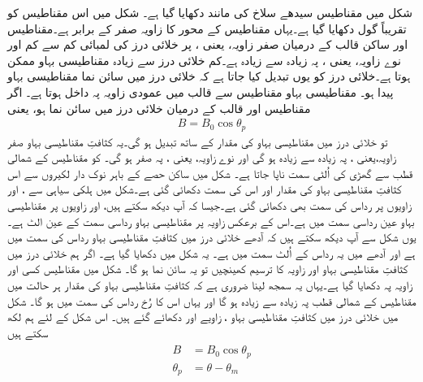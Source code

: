 شکل   میں مقناطیس سیدھے سلاخ کی مانند دکھایا گیا ہے۔ شکل   میں اس مقناطیس کو تقریباً گول دکھایا گیا ہے۔یہاں مقناطیس کے محور کا زاویہ  صفر کے برابر ہے۔مقناطیس اور ساکن قالب کے درمیان صفر زاویہ، یعنی   ، پر خلائی درز کی لمبائی کم سے کم اور نوے  زاویہ، یعنی  ، پہ زیادہ سے زیادہ ہے۔کم خلائی درز سے زیادہ مقناطیسی بہاو ممکن ہوتا ہے۔خلائی درز کو یوں تبدیل کیا جاتا ہے کہ  خلائی درز میں سائن نما مقناطیسی بہاو پیدا ہو۔ مقناطیسی بہاو مقناطیس سے قالب میں عمودی زاویہ پہ داخل ہوتا ہے۔  اگر مقناطیس اور قالب کے درمیان خلائی درز میں  سائن نما ہو، یعنی
\begin{align}
B=B_0 \cos \theta_p
\end{align}
تو خلائی درز میں مقناطیسی بہاو  کی مقدار  کے ساتھ تبدیل ہو گی۔یہ کثافتِ مقناطیسی بہاو صفر زاویہ،یعنی ، پہ زیادہ سے زیادہ ہو گی اور نوے زاویہ، یعنی  ، پہ صفر ہو گی۔ کو مقناطیس کے شمالی قطب  سے گھڑی کی اُلٹی سمت ناپا جاتا ہے۔  شکل   میں  ساکن حصے کے باہر نوک دار لکیروں سے اس کثافتِ مقناطیسی بہاو کی مقدار اور اس کی سمت دکھائی گئی ہے۔شکل میں ہلکی سیاہی سے ،  اور  زاویوں پر رداس کی سمت بھی دکھائی گئی ہے۔جیسا کہ آپ دیکھ سکتے ہیں، اور   زاویوں پر مقناطیسی بہاو عین رداسی سمت میں ہے۔اس کے برعکس زاویہ  پر مقناطیسی بہاو رداسی سمت کے عین الٹ ہے۔یوں شکل سے آپ دیکھ سکتے ہیں کہ  آدھے خلائی درز میں کثافتِ مقناطیسی بہاو  رداس کی سمت میں ہے اور آدھے میں یہ رداس کے اُلٹ سمت میں ہے۔  یہ شکل میں دکھایا گیا ہے۔ اگر ہم خلائی درز میں کثافتِ مقناطیسی بہاو  اور  زاویہ  کا ترسیم کھینچیں تو یہ سائن نما ہو گا۔ شکل   میں مقناطیس کسی اور زاویہ پہ دکھایا گیا ہے۔یہاں یہ سمجھ لینا ضروری ہے کہ کثافتِ مقناطیسی بہاو کی مقدار  ہر حالت میں مقناطیس کے شمالی قطب پہ زیادہ سے زیادہ ہو گا اور یہاں اس کا رُخ رداس کی  سمت میں ہو گا۔ شکل  میں خلائی درز میں کثافتِ مقناطیسی بہاو ، زاویے  اور  دکھائے گئے ہیں۔ اس شکل کے لئے ہم لکھ سکتے ہیں
\begin{gather}
\begin{aligned}\label{مساوات_گھومتے_مشین_کثافت_بالمقابل_میکانی_زاویہ}
B&=B_0 \cos \theta_p\\
\theta_p&=\theta-\theta_m
\end{aligned}
\end{gather}

